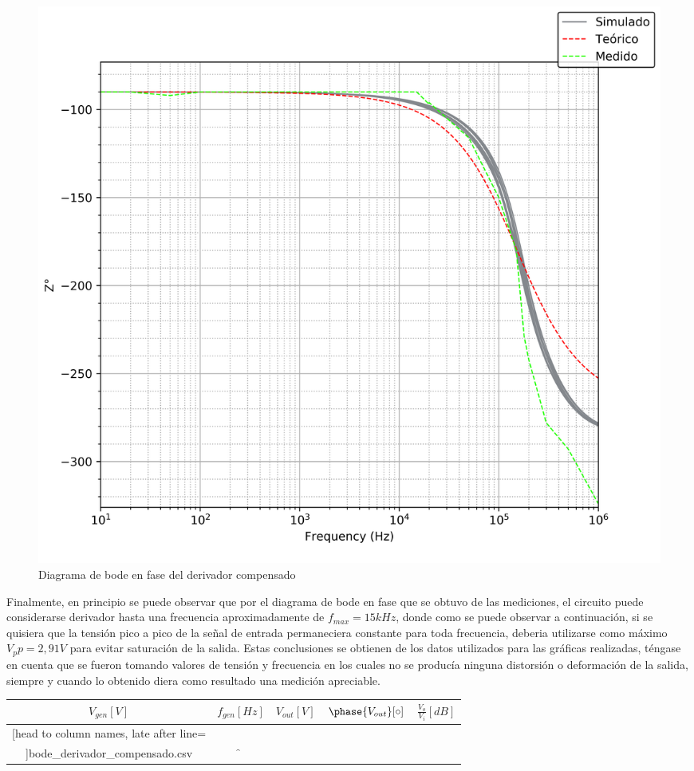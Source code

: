 \begin{figure}[H]
	\centering
	\includegraphics[scale=0.6]{Recursos/Derivador_compensado/bode_fase.png}
	\caption{Diagrama de bode en fase del derivador compensado}
	\label{fig:derivador_compensado_bode_fase}
\end{figure}

Finalmente, en principio se puede observar que por el diagrama de bode en fase que se obtuvo de las mediciones,
el circuito puede considerarse derivador hasta una frecuencia aproximadamente de $f_{max} = 15kHz$, donde como se puede
observar a continuaci\'on, si se quisiera que la tensi\'on pico a pico de la se\~nal de entrada permaneciera constante para toda
frecuencia, deberia utilizarse como m\'aximo $V_pp = 2,91 V$ para evitar saturaci\'on de la salida. Estas conclusiones se obtienen de los datos
utilizados para las gr\'aficas realizadas, t\'engase en cuenta que se fueron tomando valores de tensi\'on y frecuencia en los cuales no se produc\'ia
ninguna distorsi\'on o deformaci\'on de la salida, siempre y cuando lo obtenido diera como resultado una medici\'on apreciable.

\begin{table}[H]
	\centering
	\begin{tabular}{c c c c c}%
		$V_{gen} [V]$ & $f_{gen} [Hz]$ & $V_{out} [V]$ & $\phase{V_{out}} [\circ]$ & $\frac{V_o}{V_i} [dB]$ \\ \hline
		\csvreader[head to column names, late after line=\\]{bode_derivador_compensado.csv}{}{\gen & \f & \out & \p & \db}
		\hline
	\end{tabular}
\end{table}

